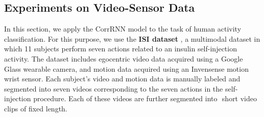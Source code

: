 \documentclass[10pt,twocolumn,letterpaper]{article}
\begin{document}



\subsection{Experiments on Video-Sensor Data}
\label{sec:exp1}
In this section, we apply the CorrRNN model to the task of human activity classification. For this purpose, we use the \textbf{ISI dataset} \cite{kumar2015fly}, a multimodal dataset in which 11 subjects perform seven actions related to an insulin self-injection activity. The dataset  includes egocentric video data acquired using a Google Glass wearable camera, and motion data acquired using an Invensense motion wrist sensor. Each subject's video and motion data is manually labeled and segmented into seven videos corresponding to the seven actions in the self-injection procedure. Each of these videos are further segmented into $ $ short video clips of fixed length. %


\end{document}
